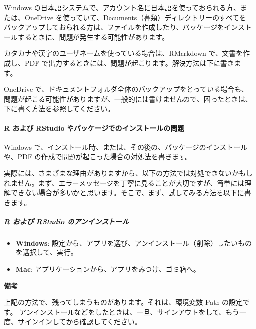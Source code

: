 \documentclass[
]{bxjsbook}
\providecommand{\tightlist}{%
  \setlength{\itemsep}{0pt}\setlength{\parskip}{0pt}}
\theoremstyle{definition}
\theoremstyle{definition}
\theoremstyle{definition}
\theoremstyle{definition}
\theoremstyle{remark}
\begin{document}
Windows の日本語システムで、アカウント名に日本語を使っておられる方、または、OneDrive を使っていて、Documents（書類）ディレクトリーのすべてをバックアップしておられる方は、ファイルを作成したり、パッケージをインストールするときに、問題が発生する可能性があります。

カタカナや漢字のユーザネームを使っている場合は、RMarkdown で、文書を作成し、PDF で出力するときには、問題が起こります。解決方法は下に書きます。

OneDrive で、ドキュメントフォルダ全体のバックアップをとっている場合も、問題が起こる可能性がありますが、一般的には書けませんので、困ったときは、下に書く方法を参照してください。

\hypertarget{r-ux304aux3088ux3073-rstudio-ux3084ux30d1ux30c3ux30b1ux30fcux30b8ux3067ux306eux30a4ux30f3ux30b9ux30c8ux30fcux30ebux306eux554fux984c}{%
\paragraph{R および RStudio やパッケージでのインストールの問題}\label{r-ux304aux3088ux3073-rstudio-ux3084ux30d1ux30c3ux30b1ux30fcux30b8ux3067ux306eux30a4ux30f3ux30b9ux30c8ux30fcux30ebux306eux554fux984c}}

Windows で、インストール時、または、その後の、パッケージのインストールや、PDF の作成で問題が起こった場合の対処法を書きます。

実際には、さまざまな理由がありますから、以下の方法では対処できないかもしれません。まず、エラーメッセージを丁寧に見ることが大切ですが、簡単には理解できない場合が多いかと思います。そこで、まず、試してみる方法を以下に書きます。

\hypertarget{r-ux304aux3088ux3073-rstudio-ux306eux30a2ux30f3ux30a4ux30f3ux30b9ux30c8ux30fcux30eb}{%
\subparagraph{R および RStudio のアンインストール}\label{r-ux304aux3088ux3073-rstudio-ux306eux30a2ux30f3ux30a4ux30f3ux30b9ux30c8ux30fcux30eb}}

\begin{itemize}
\tightlist
\item
  \textbf{Windows}: 設定から、アプリを選び、アンインストール（削除）したいものを選択して、実行。
\item
  \textbf{Mac}: アプリケーションから、アプリをみつけ、ゴミ箱へ。
\end{itemize}

\textbf{備考}

上記の方法で、残ってしまうものがあります。それは、環境変数 Path の設定です。
アンインストールなどをしたときは、一旦、サインアウトをして、もう一度、サインインしてから確認してください。
\end{document}
